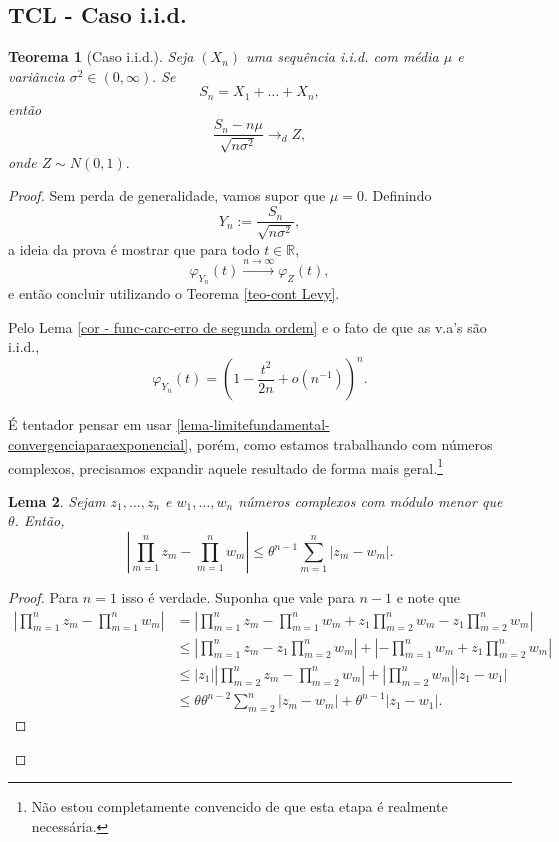 \documentclass[12pt,a4paper,oneside]{book}
\newtheorem{theorem}{Teorema}[section]
\newtheorem{lemma}[theorem]{Lema}
\theoremstyle{definition}
\theoremstyle{remark}
\numberwithin{equation}{section}
\newcommand{\R}{\mathbb{R}}
\newcommand{\rarrowlimn}{\xrightarrow{n\rightarrow \infty}}
\begin{document}
\subsection{TCL - Caso i.i.d.}\label{subsec tcl iid}



\begin{tcolorbox}
\begin{theorem}[Caso i.i.d.]\label{teo-central-iid}
Seja $(X_n)$ uma sequência i.i.d. com média $\mu$ e variância $\sigma^2\in (0,\infty).$ Se 
$$S_n = X_1+\dots + X_n, $$
então
$$\dfrac{S_n - n\mu}{\sqrt{n\sigma^2}} \longrightarrow_d Z,$$
onde $Z\sim N(0,1).$ 
\end{theorem}
\end{tcolorbox}

\begin{proof}
Sem perda de generalidade, vamos supor que $\mu = 0$.
Definindo
$$Y_n :=\dfrac{S_n}{\sqrt{n\sigma^2}}, $$
a ideia da prova é mostrar que para todo $t\in \R$,
$$\varphi_{Y_n}(t) \rarrowlimn \varphi_{Z}(t),$$
e então concluir utilizando o Teorema \ref{teo-cont Levy}.

Pelo Lema \ref{cor - func-carc-erro de segunda ordem} e o fato de que as v.a's são i.i.d.,
$$\varphi_{Y_n}(t) = \left(1 - \dfrac{t^2}{2n} + o(n^{-1})   \right)^n.  $$

É tentador pensar em usar \ref{lema-limitefundamental-convergenciaparaexponencial}, porém, como estamos trabalhando com números complexos, precisamos expandir aquele resultado de forma mais geral.\footnote{Não estou completamente convencido de que esta etapa é realmente necessária.}


\begin{lemma}\label{lema - produto complexos desi modulo soma}
Sejam $z_1,\dots,z_n$ e $w_1,\dots,w_n$ números complexos com módulo menor que $\theta$. Então, 
$$\left| \prod_{m=1}^n z_m  -\prod_{m=1}^n w_m   \right|\leq \theta^{n-1}\sum_{m=1}^n |z_m-w_m|. $$
\end{lemma}
\begin{proof}
Para $n=1$ isso é verdade. Suponha que vale para $n-1$ e  note que
\begin{align*}
\left| \prod_{m=1}^n z_m  -\prod_{m=1}^n w_m   \right| &=\left| \prod_{m=1}^n z_m  -\prod_{m=1}^n w_m  +z_1\prod_{m=2}^n w_m - z_1\prod_{m=2}^n w_m  \right|\\
&\leq   \left| \prod_{m=1}^n z_m - z_1\prod_{m=2}^n w_m  \right|+\left| -\prod_{m=1}^n w_m  +z_1\prod_{m=2}^n w_m   \right|\\
&\leq   |z_1|\left| \prod_{m=2}^n z_m -\prod_{m=2}^n w_m  \right|+\left|\prod_{m=2}^n w_m\right||z_1-w_1|\\
&\leq \theta \theta^{n-2}\sum_{m=2}^n |z_m-w_m| + \theta^{n-1}|z_1-w_1|.
\end{align*}
\end{proof}


\end{proof}
\end{document}

